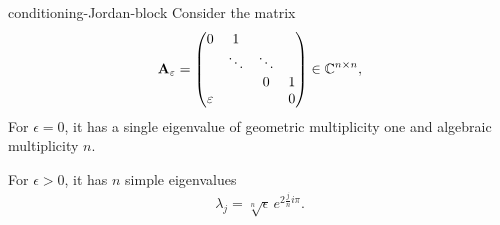 \begin{Example}{conditioning-Jordan-block}
  Consider the matrix
  \begin{gather}
  \mathbf A_\varepsilon =
      \begin{pmatrix}
        0&1\\
        &\ddots&\ddots\\
        &&0&1\\
        \varepsilon &&&0
      \end{pmatrix}
      \in\mathbb C^{n\times n},
  \end{gather}
  For $\epsilon=0$, it has a single eigenvalue of geometric multiplicity one and algebraic multiplicity $n$.

  For $\epsilon>0$, it has $n$ simple eigenvalues
  \begin{gather}
      \lambda_j = \sqrt[n]{\epsilon} \,e^{2\frac jni\pi}.
  \end{gather}
\end{Example}

